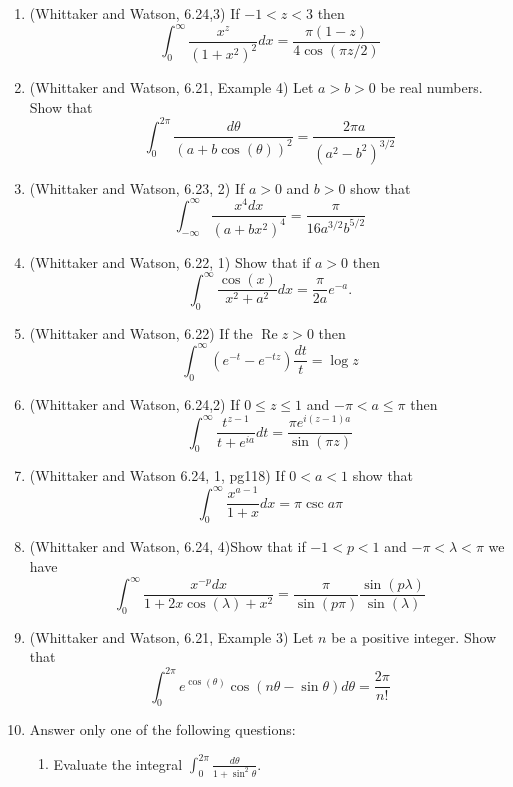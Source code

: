 \documentclass[a4paper,10pt]{article}
\renewcommand{\Re}{\operatorname{Re}}
\begin{document}
\begin{enumerate}
		\item (Whittaker and Watson, 6.24,3)
	If $-1 < z < 3$ then 
	$$ \int_0^{\infty} \frac{x^z}{(1+x^2)^2}dx = \frac{\pi (1-z) }{4 \cos( \pi z/2) }$$
	
	\item (Whittaker and Watson, 6.21, Example 4)
	Let $a>b>0$ be real numbers. 
	Show that 
	$$ \int_0^{2\pi} \frac{d\theta}{(a+b\cos(\theta))^2} = \frac{2\pi a}{(a^2-b^2)^{3/2}}$$
	
	
	\item (Whittaker and Watson, 6.23, 2) If $a>0$ and $b>0$ show that 
	$$ \int_{-\infty}^{\infty} \frac{x^4dx}{(a+bx^2)^4} = \frac{\pi}{16 a^{3/2}b^{5/2}}$$
	
	\item (Whittaker and Watson, 6.22, 1) Show that if $a>0$ then 
	$$ \int_0^{\infty} \frac{\cos(x)}{x^2+a^2}dx = \frac{\pi}{2a}e^{-a}. $$
	
	
	\item (Whittaker and Watson, 6.22)
	If the $\Re z >0$ then 
	$$ \int_0^{\infty} (e^{-t} - e^{-tz}) \frac{dt}{t} = \log z $$
	
	\item (Whittaker and Watson, 6.24,2) If $0 \leq z \leq 1$ and $-\pi< a \leq \pi$ then
	$$\int_0^{\infty} \frac{t^{z-1}}{t + e^{ia} }dt  = \frac{\pi e^{i(z-1)a}}{\sin(\pi z)} $$
	
	
	\item (Whittaker and Watson 6.24, 1, pg118)
	If $0<a<1$ show that 
	$$ \int_0^{\infty} \frac{x^{a-1}}{1+x}dx = \pi \csc a \pi $$
	
	
	\item (Whittaker and Watson, 6.24, 4)Show that if $-1<p<1$ and $-\pi<\lambda<\pi$ we have 
	$$ \int_0^{\infty} \frac{x^{-p} dx}{1 + 2x \cos(\lambda) + x^2 } = \frac{\pi}{\sin(p\pi)} \frac{\sin(p\lambda)}{\sin(\lambda)}$$
	
	\item  (Whittaker and Watson, 6.21, Example 3)
	Let $n$ be a positive integer. 
	Show that 
	$$ \int_0^{2\pi} e^{\cos(\theta)} \cos(n\theta - \sin\theta)d\theta = \frac{2\pi}{n!}$$
	
\item 
	
	Answer only one of the following questions:
	\begin{enumerate}
	\item Evaluate the integral $\int_{0}^{2\pi}\frac{d\theta}{1+\sin^{2}\theta}$.
	

\end{enumerate}
\end{enumerate}
\end{document}
